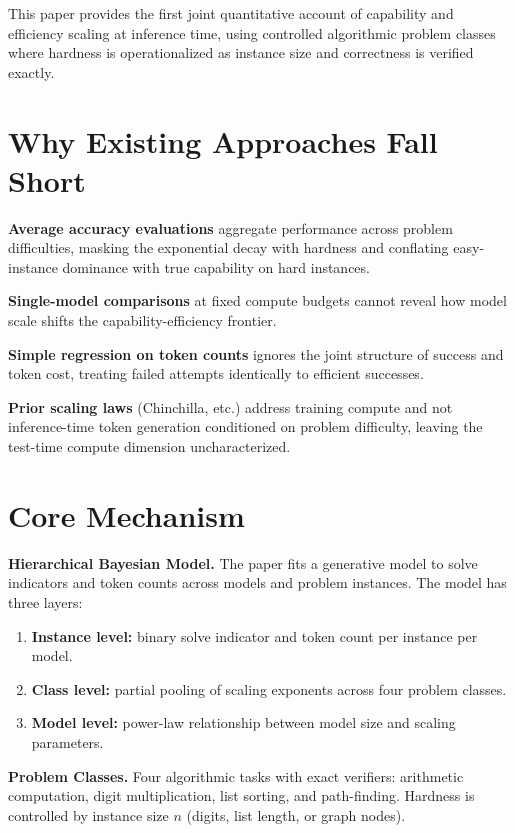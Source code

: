 \documentclass[10pt,twocolumn]{article}
\begin{document}
This paper provides the first joint quantitative account of capability and
efficiency scaling at inference time, using controlled algorithmic problem
classes where hardness is operationalized as instance size and correctness
is verified exactly.

\section{Why Existing Approaches Fall Short}

\textbf{Average accuracy evaluations} aggregate performance across problem
difficulties, masking the exponential decay with hardness and conflating
easy-instance dominance with true capability on hard instances.

\textbf{Single-model comparisons} at fixed compute budgets cannot reveal
how model scale shifts the capability-efficiency frontier.

\textbf{Simple regression on token counts} ignores the joint structure of
success and token cost, treating failed attempts identically to efficient
successes.

\textbf{Prior scaling laws} (Chinchilla, etc.) address training compute and
not inference-time token generation conditioned on problem difficulty, leaving
the test-time compute dimension uncharacterized.

\section{Core Mechanism}

\textbf{Hierarchical Bayesian Model.} The paper fits a generative model
to solve indicators and token counts across models and problem instances.
The model has three layers:
\begin{enumerate}[itemsep=2pt,parsep=0pt]
  \item \textbf{Instance level:} binary solve indicator and token count per
    instance per model.
  \item \textbf{Class level:} partial pooling of scaling exponents across
    four problem classes.
  \item \textbf{Model level:} power-law relationship between model size and
    scaling parameters.
\end{enumerate}

\textbf{Problem Classes.} Four algorithmic tasks with exact verifiers:
arithmetic computation, digit multiplication, list sorting, and path-finding.
Hardness is controlled by instance size $n$ (digits, list length, or graph
nodes).
\end{document}
